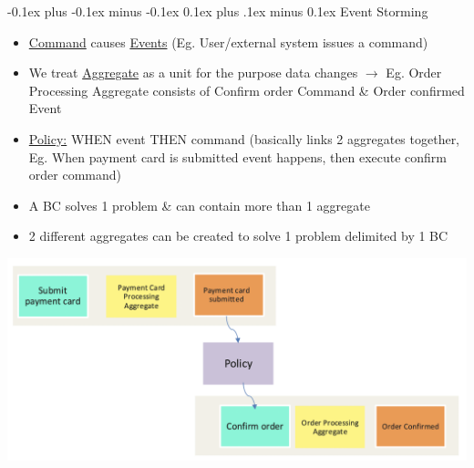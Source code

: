 \documentclass[landscape]{article}
\makeatletter
\renewcommand{\subsection}{\@startsection{subsection}{2}{0mm}%
  {-0.1ex plus -0.1ex minus -0.1ex}%
  {0.1ex plus .1ex minus 0.1ex}%
{\normalfont\scriptsize\bfseries}}
\makeatother
\begin{document}
\begin{multicols*}{5}
    \subsection{Event Storming}
    \begin{itemize}
      \item \underline{Command} causes \underline{Events} (Eg. User/external system issues a command)
      \item We treat \underline{Aggregate} as a unit for the purpose data changes $\rightarrow$ Eg. Order Processing Aggregate consists of Confirm order Command \& Order confirmed Event
      \item \underline{Policy:} WHEN event THEN command (basically links 2 aggregates together, Eg. When payment card is submitted event happens, then execute confirm order command)
      \item A BC solves 1 problem \& can contain more than 1 aggregate
      \item 2 different aggregates can be created to solve 1 problem delimited by 1 BC
    \end{itemize}
    \includegraphics[width=0.75\linewidth]{2_event_storming.png}
\end{multicols*}
\end{document}
